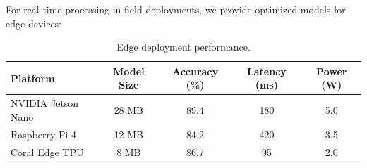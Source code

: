 For real-time processing in field deployments, we provide optimized models for edge devices:

\begin{table}[htbp]
\centering
\caption{Edge deployment performance.}
\label{tab:edge}
\begin{tabular}{lcccc}
\toprule
\textbf{Platform} & \textbf{Model Size} & \textbf{Accuracy (\%)} & \textbf{Latency (ms)} & \textbf{Power (W)} \\
\midrule
NVIDIA Jetson Nano & 28 MB & 89.4 & 180 & 5.0 \\
Raspberry Pi 4 & 12 MB & 84.2 & 420 & 3.5 \\
Coral Edge TPU & 8 MB & 86.7 & 95 & 2.0 \\
\bottomrule
\end{tabular}
\end{table}

